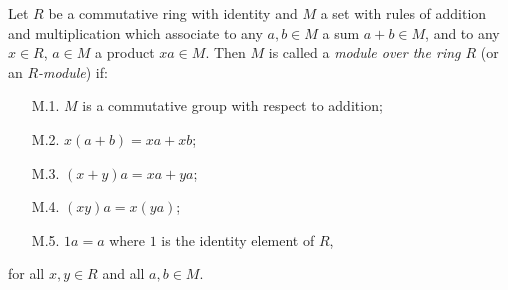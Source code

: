 Let $R$ be a commutative ring with identity and $M$ a set with rules of addition and multiplication which associate to any $a, b \in M$ a sum $a+b \in M$, and to any $x \in R$, $a \in M$ a product $xa \in M$. Then $M$ is called a \emph{module over the ring $R$} (or an \emph{$R$-module}) if:
\begin{itemize}
\item[M.1.] $M$ is a commutative group with respect to addition;
\item[M.2.] $x(a+b) = xa + xb$;
\item[M.3.] $(x+y)a = xa + ya$;
\item[M.4.] $(xy)a = x(ya)$;
\item[M.5.] $1a = a$ where $1$ is the identity element of $R$,
\end{itemize}
for all $x, y \in R$ and all $a, b \in M$.
